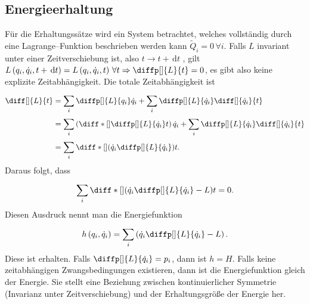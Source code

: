 \documentclass[a4paper,12pt]{article}
\newcommand{\td}{\,\text{d}}
\numberwithin{equation}{section}
\begin{document}
\subsection{Energieerhaltung}
Für die Erhaltungssätze wird ein System betrachtet, welches vollständig durch eine Lagrange--Funktion beschrieben werden kann $\tilde Q_i=0\,\forall i$. Falls $L$ invariant unter einer Zeitverschiebung ist, also $t\rightarrow t+\td t$ , gilt $L\left(q_i,\dot{q}_i,t+\td t\right)=L\left(q_i,\dot{q}_i,t\right)\,\forall t\Rightarrow \diffp[]{L}{t}=0$, es gibt also keine explizite Zeitabhängigkeit. Die totale Zeitabhängigkeit ist
\begin{align*}
        \diff[]{L}{t}&=\sum_{i}^{}\diffp[]{L}{q_i}\dot{q}_i+\sum_{i}^{}\diffp[]{L}{\dot{q}_i}\diff[]{\dot{q}_i}{t}\\
                     &=\sum_{i}^{}\left(\diff*[]{\diffp[]{L}{\dot{q}_i}}{t}\right)\dot{q}_i+\sum_{i}^{}\diffp[]{L}{\dot{q}_i}\diff[]{\dot{q}_i}{t}\\
                     &=\sum_{i}^{}\diff*[]{\left(\dot{q}_i\diffp[]{L}{\dot{q}_i}\right)}{t}
.\end{align*}
Daraus folgt, dass 
\[ 
        \sum_{i}^{}\diff*[]{\left(\dot{q}_i\diffp[]{L}{\dot{q}_i}-L\right)}{t}=0
.\] 
Diesen Ausdruck nennt man die Energiefunktion
\[ 
        h\left(q_i,\dot{q}_i\right)=\sum_{i}^{}\left(\dot{q}_i\diffp[]{L}{\dot{q}_i}-L\right)
.\] 
Diese ist erhalten. Falls $\diffp[]{L}{\dot{q}_i}=p_i$, dann ist $h=H$. Falls keine zeitabhängigen Zwangsbedingungen existieren, dann ist die Energiefunktion gleich der Energie. Sie stellt eine Beziehung zwischen kontinuierlicher Symmetrie (Invarianz unter Zeitverschiebung) und der Erhaltungsgröße der Energie her.
\end{document}

